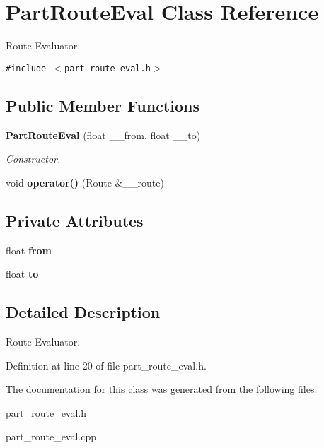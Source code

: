 \section{PartRouteEval Class Reference}
\label{class_part_route_eval}
Route Evaluator.  


{\tt \#include $<$part\_\-route\_\-eval.h$>$}

\subsection*{Public Member Functions}
\begin{CompactItemize}
\item 
{\bf PartRouteEval} (float \_\-\_\-from, float \_\-\_\-to)\label{class_part_route_eval_a331566b29bc3227f377004232f05491}

\begin{CompactList}\small\item\em Constructor. \item\end{CompactList}\item 
void {\bf operator()} (Route \&\_\-\_\-route)\label{class_part_route_eval_965fab875fb601f17934a6ece761beae}

\end{CompactItemize}
\subsection*{Private Attributes}
\begin{CompactItemize}
\item 
float {\bf from}\label{class_part_route_eval_5bde722e66378b2570ae6c4b4f8df58e}

\item 
float {\bf to}\label{class_part_route_eval_de53cc919faa498663f327b72c357da3}

\end{CompactItemize}


\subsection{Detailed Description}
Route Evaluator. 



Definition at line 20 of file part\_\-route\_\-eval.h.

The documentation for this class was generated from the following files:\begin{CompactItemize}
\item 
part\_\-route\_\-eval.h\item 
part\_\-route\_\-eval.cpp\end{CompactItemize}
